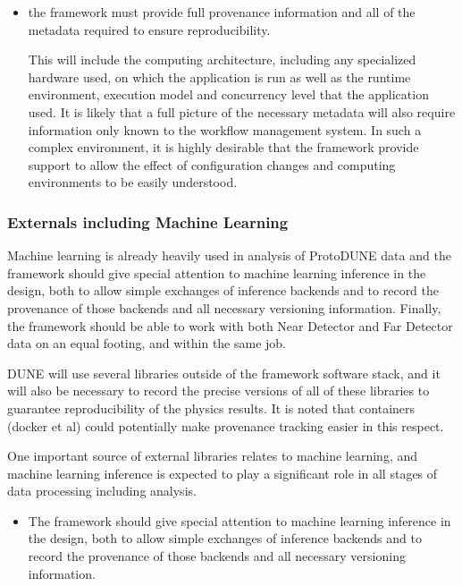 \documentclass[../main-v1.tex]{subfiles}
\begin{document}
\begin{itemize}
\item the framework must provide full provenance information and all of the metadata required to ensure reproducibility.  

This will include the computing architecture, including any specialized hardware used, on which the application is run as well as the runtime environment, execution model and concurrency level that the application used.  It is likely that a full picture of the necessary metadata will also require information only known to the workflow management system.  In such a complex environment, it is highly desirable that the framework provide support to allow the effect of configuration changes and computing environments to be easily understood.

\end{itemize}

\subsubsection{Externals including Machine Learning}
Machine learning is already heavily used in analysis of ProtoDUNE data and the framework should give special attention to machine learning inference in the design, both to allow simple exchanges of inference backends and to record the provenance of those backends and all necessary versioning information.  Finally, the framework should be able to work with both Near Detector and Far Detector data on an equal footing, and within the same job.

DUNE will use several libraries outside of the framework software stack, and it will also be necessary to record the precise versions of all of these libraries to guarantee reproducibility of the physics results.  It is noted that containers (docker et al) could potentially make provenance tracking easier in this respect.  



One important source of external libraries relates to machine learning, and machine learning inference is expected to play a significant role in all stages of data processing including analysis.  

\begin{itemize}
\item The framework should give special attention to machine learning inference in the design, both to allow simple exchanges of inference backends and to record the provenance of those backends and all necessary versioning information.



\end{itemize}
\end{document}
